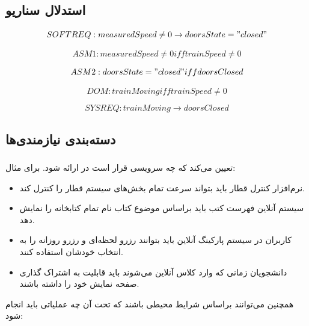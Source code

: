 \subsection*{استدلال سناریو}

\begin{equation}
    SOFTREQ: measuredSpeed \neq 0 \rightarrow doorsState = "closed"
\end{equation}

\begin{equation}
    ASM1: measuredSpeed \neq 0 iff trainSpeed \neq 0
\end{equation}

\begin{equation}
    ASM2: doorsState = "closed" iff doorsClosed
\end{equation}

\begin{equation}
    DOM: trainMoving iff trainSpeed \neq 0 
\end{equation}

\begin{equation}
    SYSREQ: trainMoving \rightarrow doorsClosed 
\end{equation}

\subsection{دسته‌بندی نیازمندی‌ها}

\subsubsection{}

تعیین می‌کند که چه سرویسی قرار است در  ارائه شود. برای مثال:

\begin{itemize}
    \item نرم‌افزار کنترل قطار باید بتواند سرعت تمام بخش‌های سیستم قطار را کنترل
    کند.
    \item سیستم آنلاین فهرست کتب باید براساس موضوع کتاب نام تمام کتابخانه را
    نمایش دهد. 
    \item کاربران در سیستم پارکینگ آنلاین باید بتوانند رزرو لحظه‌ای و رزرو
    روزانه را به انتخاب خودشان استفاده کنند.
    \item دانشجویان زمانی که وارد کلاس آنلاین می‌شوند باید قابلیت به اشتراک
    گذاری صفحه نمایش خود را داشته باشند.
\end{itemize}

همچنین می‌توانند براساس شرایط محیطی باشند که تحت آن چه عملیاتی باید انجام شود:

